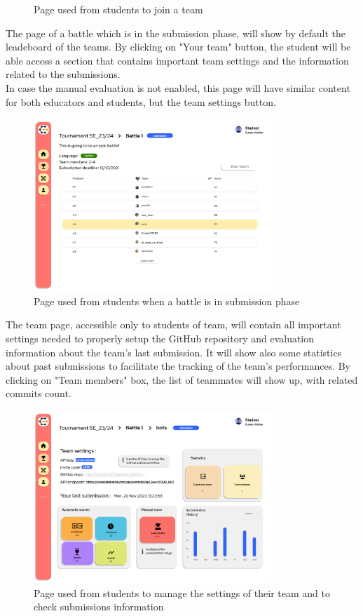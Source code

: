 \begin{enumerate}[label=\textbf{F\arabic*)}]
\begin{figure}[H]
        \caption{Page used from students to join a team}
    \end{figure}
    The page of a battle which is in the submission phase, will show by default the leadeboard of the teams. By clicking on "Your team" button, the student will be able access a section that contains important team settings and the information related to the submissions.\\
    In case the manual evaluation is not enabled, this page will have similar content for both educators and students, but the team settings button.\\

    \begin{figure}[H]
        \centering
        \includegraphics[width=0.8\textwidth]{Mockups/14_student_battle_submission.png}
        \caption{Page used from students when a battle is in submission phase}
    \end{figure}
    The team page, accessible only to students of team, will contain all important settings needed to properly setup the GitHub repository and evaluation information about the team's last submission. It will show also some statistics about past submissions to facilitate the tracking of the team's performances.
    By clicking on "Team members" box, the list of teammates will show up, with related commits count.\\
    \begin{figure}[H]
        \centering
        \includegraphics[width=0.8\textwidth]{Mockups/15_student_team.png}
        \caption{Page used from students to manage the settings of their team and to check submissions information}
    \end{figure}
    

\end{enumerate}
